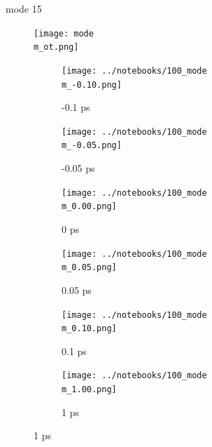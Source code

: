\documentclass{beamer}
\newcommand\w{0.32}
\begin{document}
\renewcommand\m{15}
\begin{frame}{mode \m}
			\vspace{\vh mm}
	\begin{figure}
		\centering
		\texttt{[image: mode\\m\_ot.png]}
	\end{figure}
	\begin{figure}
		\centering
		\begin{subfigure}[b]{\w\textwidth}
			\centering
			\texttt{[image: ../notebooks/100\_mode\\m\_-0.10.png]}
			\caption{-0.1 ps}
		\end{subfigure}
		\begin{subfigure}[b]{\w\textwidth}
			\centering
			\texttt{[image: ../notebooks/100\_mode\\m\_-0.05.png]}
			\caption{-0.05 ps}
		\end{subfigure}
		\begin{subfigure}[b]{\w\textwidth}
			\centering
			\texttt{[image: ../notebooks/100\_mode\\m\_0.00.png]}
			\caption{0 ps}
		\end{subfigure}
		\begin{subfigure}[b]{\w\textwidth}
			\centering
			\texttt{[image: ../notebooks/100\_mode\\m\_0.05.png]}
			\caption{0.05 ps}
		\end{subfigure}
		\begin{subfigure}[b]{\w\textwidth}
			\centering
			\texttt{[image: ../notebooks/100\_mode\\m\_0.10.png]}
			\caption{0.1 ps}
		\end{subfigure}
		\begin{subfigure}[b]{\w\textwidth}
			\centering
			\texttt{[image: ../notebooks/100\_mode\\m\_1.00.png]}
			\caption{1 ps}
		\end{subfigure}
	\end{figure}
\end{frame}
\end{document}
